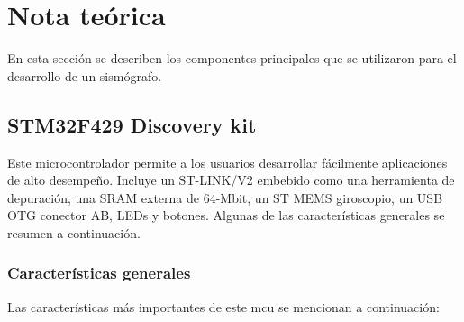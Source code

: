 \section{Nota teórica}
En esta sección se describen los componentes principales que se utilizaron para el desarrollo de un sismógrafo.
\subsection*{STM32F429 Discovery kit}
Este microcontrolador permite a los usuarios desarrollar fácilmente aplicaciones de alto desempeño. Incluye un ST-LINK/V2 embebido como una herramienta de depuración, una SRAM externa de 64-Mbit, un ST MEMS giroscopio, un USB OTG conector AB, LEDs y botones. Algunas de las características generales se resumen a continuación.

\subsubsection*{Características generales}
Las características más importantes de este mcu se mencionan a continuación:
